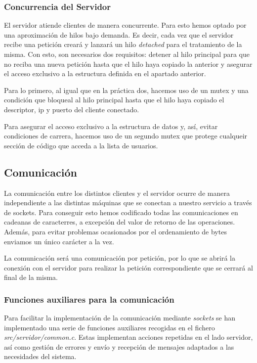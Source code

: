 \documentclass[]{article}
\begin{document}
\subsubsection{Concurrencia del Servidor}
\label{subsec::concurrencia_servidor}
El servidor atiende clientes de manera concurrente. Para esto hemos optado por una aproximación de hilos bajo demanda. Es decir, cada vez que el servidor recibe una petición creará y lanzará un hilo \textit{detached} para el tratamiento de la misma. Con esto, son necesarios dos requisitos: detener al hilo principal para que no reciba una nueva petición hasta que el hilo haya copiado la anterior y asegurar el acceso exclusivo a la estructura definida en el apartado anterior. 

Para lo primero, al igual que en la práctica dos, hacemos uso de un mutex y una condición que bloqueal al hilo principal hasta que el hilo haya copiado el descriptor, ip y puerto del cliente conectado. 

Para asegurar el acceso exclusivo a la estructura de datos y, así, evitar condiciones de carrera, hacemos uso de un segundo mutex que protege cualqueir sección de código que acceda a la lista de usuarios. 

\subsection{Comunicación}
\label{subsec:comunicacion}
La comunicación entre los distintos clientes y el servidor ocurre de manera independiente a las distintas máquinas que se conectan a nuestro servicio a través de sockets. Para conseguir esto hemos codificado todas las comunicaciones en cadeanas de caracterres, a excepción del valor de retorno de las operaciones. Además, para evitar problemas ocasionados por el ordenamiento de bytes enviamos un único carácter a la vez. 

La comunicación será una comunicación por petición, por lo que se abrirá la conexión con el servidor para realizar la petición correspondiente que se cerrará al final de la misma.

\subsubsection{Funciones auxiliares para la comunicación}
\label{subsec:funciones}
Para facilitar la implementación de la comunicación mediante \textit{sockets} se han implementado una serie de funciones auxiliares recogidas en el fichero \textit{src/servidor/common.c}. Estas implementan acciones repetidas en el lado servidor, así como gestión de errores y envío y recepción de mensajes adaptados a las necesidades del sistema. 
\end{document}
